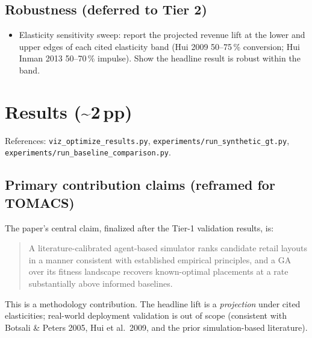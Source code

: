 \documentclass[11pt]{article}
\begin{document}
\subsection*{Robustness (deferred to Tier 2)}
\begin{itemize}[leftmargin=*]
  \item Elasticity sensitivity sweep: report the projected revenue
    lift at the lower and upper edges of each cited elasticity band
    (Hui 2009 50--75\,\% conversion; Hui Inman 2013 50--70\,\%
    impulse). Show the headline result is robust within the band.
\end{itemize}

\section{Results (\textasciitilde 2\,pp)}
References: \texttt{viz\_optimize\_results.py},
\texttt{experiments/run\_synthetic\_gt.py},
\texttt{experiments/run\_baseline\_comparison.py}.

\subsection*{Primary contribution claims (reframed for TOMACS)}

The paper's central claim, finalized after the Tier-1 validation
results, is:

\begin{quote}
A literature-calibrated agent-based simulator ranks candidate retail
layouts in a manner consistent with established empirical principles,
and a GA over its fitness landscape recovers known-optimal placements
at a rate substantially above informed baselines.
\end{quote}

This is a methodology contribution. The headline lift is a
\emph{projection} under cited elasticities; real-world deployment
validation is out of scope (consistent with Botsali \& Peters 2005,
Hui et al.\ 2009, and the prior simulation-based literature).
\end{document}
